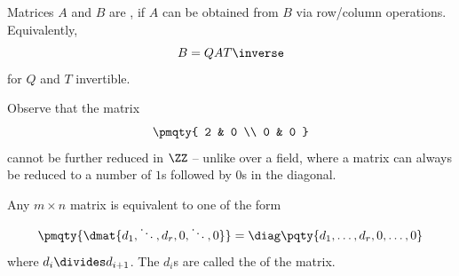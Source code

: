 \begin{definition}
    \label{def:equivalent-matrix}%
    Matrices \(A\) and \(B\) are , if \(A\) can be obtained from \(B\) via row/column operations. Equivalently,
    \[
        B = Q A T\inverse
    \]
    for \(Q\) and \(T\) invertible.
\end{definition}

Observe that the matrix
\[
    \pmqty{
        2 & 0 \\ 0 & 0
    }
\]
cannot be further reduced in \(\ZZ\) -- unlike over a field, where a matrix can always be reduced to a number of \(1\)s followed by \(0\)s in the diagonal.

\begin{theorem}
    \label{thm:smith-normal-form}%
    Any \(m \times n\) matrix is equivalent to one of the form
    \[
        \pmqty{
            \dmat{d_1, \ddots, d_r, 0, \ddots, 0}
        } = \diag\pqty{d_1, \ldots, d_r, 0, \ldots, 0}
    \]
    where \(d_i \divides d_{i + 1}\). The \(d_i\)s are called the  of the matrix.
\end{theorem}

